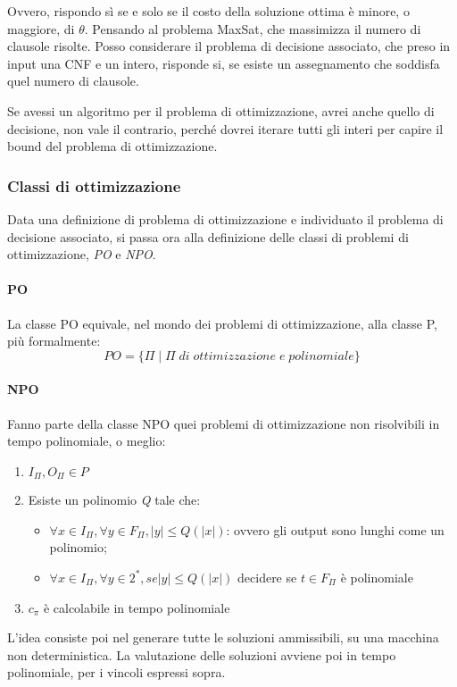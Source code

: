 Ovvero, rispondo sì se e solo se il costo della soluzione ottima è minore, 
o maggiore, di $\theta$.
Pensando al problema MaxSat, che massimizza il numero di clausole risolte. 
Posso considerare il problema di decisione associato, che preso in input 
una CNF e un intero, risponde si, se esiste un assegnamento che soddisfa quel
numero di clausole.

Se avessi un algoritmo per il problema di ottimizzazione, avrei anche quello 
di decisione, non vale il contrario, perché dovrei iterare tutti gli interi
per capire il bound del problema di ottimizzazione.

\subsubsection{Classi di ottimizzazione}
Data una definizione di problema di ottimizzazione e individuato il problema di decisione 
associato, si passa ora alla definizione delle classi di problemi di ottimizzazione, \emph{PO}
e \emph{NPO}.

\paragraph{PO}
La classe PO equivale, nel mondo dei problemi di ottimizzazione, alla classe P,
più formalmente:
$$PO = \{ \Pi\;|\;\Pi\;di\;ottimizzazione\;e\;polinomiale\}$$

\paragraph{NPO}
Fanno parte della classe NPO quei problemi di ottimizzazione non risolvibili 
in tempo polinomiale, o meglio:
\begin{enumerate}
    \item $I_\Pi, O_\Pi \in P$
    \item Esiste un polinomio \emph{Q} tale che:
        \begin{itemize}
            \item $\forall x \in I_\Pi, \forall y \in F_\Pi, |y| \leq Q(|x|)$: ovvero gli output sono lunghi come un polinomio;
            \item $\forall x \in I_\Pi, \forall y \in 2^*, se |y| \leq Q(|x|)$ decidere
            se $t \in F_\Pi$ è polinomiale
        \end{itemize}
    \item $c_\pi$ è calcolabile in tempo polinomiale
\end{enumerate}
L'idea consiste poi nel generare tutte le soluzioni ammissibili, su una macchina 
non deterministica.
La valutazione delle soluzioni avviene poi in tempo polinomiale, per i vincoli espressi
sopra.

